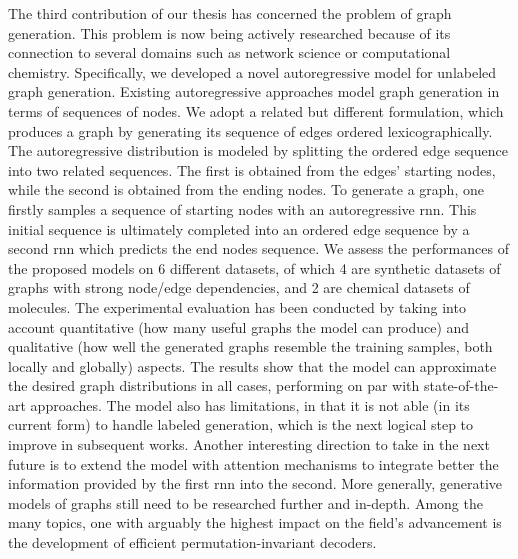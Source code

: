 The third contribution of our thesis has concerned the problem of graph generation. This problem is now being actively researched because of its connection to several domains such as network science or computational chemistry. Specifically, we developed a novel autoregressive model for unlabeled graph generation. Existing autoregressive approaches model graph generation in terms of sequences of nodes. We adopt a related but different formulation, which produces a graph by generating its sequence of edges ordered lexicographically. The autoregressive distribution is modeled by splitting the ordered edge sequence into two related sequences. The first is obtained from the edges' starting nodes, while the second is obtained from the ending nodes. To generate a graph, one firstly samples a sequence of starting nodes with an autoregressive \gls{rnn}. This initial sequence is ultimately completed into an ordered edge sequence by a second \gls{rnn} which predicts the end nodes sequence. We assess the performances of the proposed models on 6 different datasets, of which 4 are synthetic datasets of graphs with strong node/edge dependencies, and 2 are chemical datasets of molecules. The experimental evaluation has been conducted by taking into account quantitative (\ie how many useful graphs the model can produce) and qualitative (\ie how well the generated graphs resemble the training samples, both locally and globally) aspects. The results show that the model can approximate the desired graph distributions in all cases, performing on par with state-of-the-art approaches. The model also has limitations, in that it is not able (in its current form) to handle labeled generation, which is the next logical step to improve in subsequent works. Another interesting direction to take in the next future is to extend the model with attention mechanisms to integrate better the information provided by the first \gls{rnn} into the second. More generally, generative models of graphs still need to be researched further and in-depth. Among the many topics, one with arguably the highest impact on the field's advancement is the development of efficient permutation-invariant decoders.
\vspace{1em}


